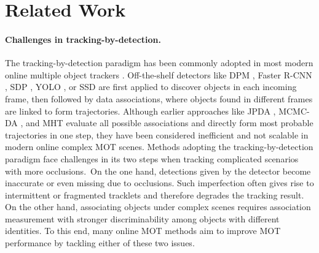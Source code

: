 \documentclass[final]{cvpr}
\begin{document}
\section{Related Work}
\paragraph{Challenges in tracking-by-detection.}
The tracking-by-detection paradigm has been commonly adopted in most modern online multiple object trackers \cite{Bewley2016,Wang2014_ECCV,Wang2016_TPAMI,Lan2020_IJCV,Maksai2016_CVPR,Maksai2017_ICCV,Wojke2017, Wang2017, Chen2018, Zhu2018, Xu2019, Bergmann2019a, Xu2020a, Liu2020}. Off-the-shelf detectors like DPM \cite{Redmon2016}, Faster R-CNN \cite{Ren2015}, SDP \cite{Yang2016}, YOLO \cite{Redmon2016}, or SSD \cite{Liu2016} are first applied to discover objects in each incoming frame, then followed by data associations, where objects found in different frames are linked to form trajectories. Although earlier approaches like JPDA \cite{Fortmann1980, Rezatofighi2015}, MCMC-DA \cite{Oh2009}, and MHT \cite{Blackman2004, Zhai2010, Kim2015} evaluate all possible associations and directly form most probable trajectories in one step, they have been considered inefficient and not scalable in modern online complex MOT scenes. Methods adopting the tracking-by-detection paradigm face challenges in its two steps when tracking complicated scenarios with more occlusions.\
On the one hand, detections given by the detector become inaccurate or even missing due to occlusions. Such imperfection often gives rise to intermittent or fragmented tracklets and therefore degrades the tracking result. On the other hand, associating objects under complex scenes requires association measurement with stronger discriminability among objects with different identities. To this end, many online MOT methods aim to improve MOT performance by tackling either of these two issues.
\end{document}
